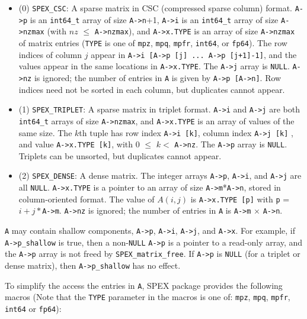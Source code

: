 \documentclass[12pt]{report}
\theoremstyle{definition}
\begin{document}
\begin{itemize}
\item
 (0) \verb|SPEX_CSC|:  A sparse matrix in CSC (compressed sparse column) format.
      \verb|A->p| is an \verb|int64_t| array of size \verb|A->n|+1, \verb|A->i|
      is an \verb|int64_t| array of size \verb|A->nzmax| (with $nz$ $\le$
      \verb|A->nzmax|), and \verb|A->x.TYPE| is an array of size
      \verb|A->nzmax| of matrix entries (\verb'TYPE' is one of \verb|mpz|,
      \verb|mpq|, \verb|mpfr|, \verb|int64|, or \verb|fp64|).  The row indices
      of column $j$ appear in \verb|A->i [A->p [j] ... A->p [j+1]-1]|, and the
      values appear in the same locations in \verb|A->x.TYPE|.  The \verb|A->j|
      array is \verb|NULL|.  \verb|A->nz| is ignored; the number of entries in
      \verb|A| is given by \verb|A->p [A->n]|.
      Row indices need not be sorted in each column, but duplicates cannot
      appear.

\item
 (1) \verb|SPEX_TRIPLET|:  A sparse matrix in triplet format.  \verb|A->i| and
     \verb|A->j| are both \verb|int64_t| arrays of size \verb|A->nzmax|, and
     \verb|A->x.TYPE| is an array of values of the same size.  The $k$th tuple
     has row index \verb|A->i [k]|, column index \verb|A->j [k]| , and value
     \verb|A->x.TYPE [k]|, with 0 $\le$ $k <$ \verb|A->nz|.
     The \verb|A->p| array is \verb|NULL|.
     Triplets can be unsorted, but duplicates cannot appear.

\item
 (2) \verb|SPEX_DENSE|:  A dense matrix.  The integer arrays \verb|A->p|,
     \verb|A->i|, and \verb|A->j| are all \verb|NULL|.  \verb|A->x.TYPE| is a
     pointer to an array of size \verb|A->m|*\verb|A->n|, stored in
     column-oriented format.  The value of $A(i,j)$ is \verb|A->x.TYPE [p]|
     with \verb|p| = $i + j*$\verb|A->m|.  \verb|A->nz| is ignored; the number
     of entries in \verb|A| is \verb|A->m| $\times$ \verb|A->n|.

\end{itemize}

\verb|A| may contain shallow components, \verb|A->p|, \verb|A->i|, \verb|A->j|,
and \verb|A->x|.  For example, if \verb|A->p_shallow| is true, then a
non-\verb|NULL| \verb|A->p| is a pointer to a read-only array, and the
\verb|A->p| array is not freed by \verb|SPEX_matrix_free|.  If \verb|A->p| is
\verb|NULL| (for a triplet or dense matrix), then \verb|A->p_shallow| has no
effect.

To simplify the access the entries in \verb|A|, SPEX package provides the
following macros (Note that the \verb|TYPE| parameter in the macros is one of:
\verb|mpz|, \verb|mpq|, \verb|mpfr|, \verb|int64| or \verb|fp64|):
\end{document}
